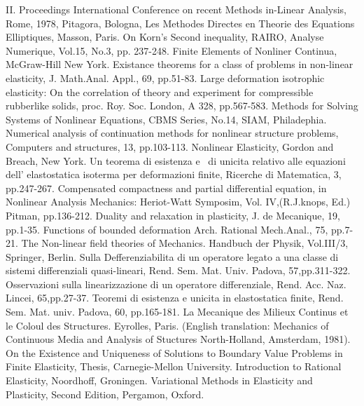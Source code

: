 \begin{thebibliography}{99}
  II. Proceedings International Conference on recent Methods in-Linear
  Analysis, Rome, 1978, Pitagora, Bologna, 
 Les Methodes Directes en Theorie des
  Equations Elliptiques, Masson, Paris. 
 On Korn's Second inequality, RAIRO,
  Analyse Numerique, Vol.15, No.3, pp. 237-248. 
 Finite Elements of Nonliner Continua,
  McGraw-Hill New York. 
 Existance theorems for a class of
  problems in non-linear elasticity, J. Math.Anal. Appl., 69, pp.51-83.  
 Large deformation isotrophic
  elasticity: On the correlation of theory and experiment for
  compressible rubberlike solids, proc. Roy. Soc. London, A
  328, pp.567-583.  
 Methods for Solving Systems of
  Nonlinear Equations, CBMS Series, No.14, SIAM, Philadephia. 
 Numerical analysis of
  continuation methods for nonlinear structure problems, Computers and
  structures, 13, pp.103-113. 
 Nonlinear Elasticity, Gordon and
  Breach, New York. 
 Un teorema di esistenza e ~di
  unicita relativo alle equazioni dell' elastostatica isoterma per
  deformazioni finite, Ricerche di Matematica, 3, pp.247-267. 
 Compensated compactness and partial
  differential equation, in Nonlinear Analysis Mechanics: Heriot-Watt
  Symposim, Vol. IV,(R.J.knops, Ed.) Pitman, pp.136-212. 
 Duality and relaxation
  in plasticity, J. de Mecanique, 19, pp.1-35.  
 Functions of bounded
  deformation Arch. Rational Mech.Anal., 75, pp.7-21. 
 The Non-linear field
  theories of Mechanics. Handbuch der Physik, Vol.III/3, Springer,
  Berlin. 
 Sulla Defferenziabilita di un
  operatore legato a una classe di sistemi differenziali
  quasi-lineari, Rend. Sem. Mat. Univ. Padova, 57,pp.311-322. 
 Osservazioni sulla linearizzazione di
  un operatore differenziale, Rend. Acc. Naz. Lincei, 65,pp.27-37.
 Teoremi di esistenza e unicita in
  elastostatica finite, Rend. Sem. Mat. univ. Padova, 60, pp.165-181. 
 La Mecanique des Milieux Continus et le
  Coloul des Structures. Eyrolles, Paris. (English translation:
  Mechanics of Continuous Media and Analysis of Stuctures
  North-Holland, Amsterdam, 1981). 
 On the Existence and Uniqueness of
  Solutions to Boundary Value Problems in Finite Elasticity, Thesis,
  Carnegie-Mellon University. 
 Introduction to
  Rational Elasticity, Noordhoff, Groningen. 
 Variational Methods in Elasticity and
  Plasticity, Second Edition, Pergamon, Oxford.  
 \end{thebibliography} 

